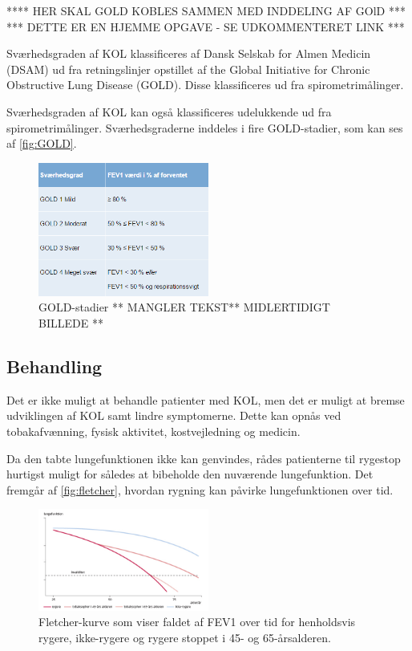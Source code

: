 \noindent
**** HER SKAL GOLD KOBLES SAMMEN MED INDDELING AF GOlD ***
*** DETTE ER EN HJEMME OPGAVE - SE UDKOMMENTERET LINK ***

Sværhedsgraden af KOL klassificeres af Dansk Selskab for Almen Medicin (DSAM) ud fra retningslinjer opstillet af the Global Initiative for Chronic Obstructive Lung Disease (GOLD). Disse klassificeres ud fra spirometrimålinger. 

Sværhedsgraden af KOL kan også klassificeres udelukkende ud fra spirometrimålinger. Sværhedsgraderne inddeles i fire GOLD-stadier, som kan ses af \autoref{fig:GOLD}.

\begin{figure} [H]
\centering
\includegraphics[width=0.5\textwidth]{figures/GOLD}
\caption{GOLD-stadier ** MANGLER TEKST** MIDLERTIDIGT BILLEDE ** \cite{Basisbogen2016, Sundhed2013}}
\label{fig:GOLD}
\end{figure} 


\subsection{Behandling}
Det er ikke muligt at behandle patienter med KOL, men det er muligt at bremse udviklingen af KOL samt lindre symptomerne. Dette kan opnås ved tobakafvænning, fysisk aktivitet, kostvejledning og medicin. 

Da den tabte lungefunktionen ikke kan genvindes, rådes patienterne til rygestop hurtigst muligt for således at bibeholde den nuværende lungefunktion. Det fremgår af \autoref{fig:fletcher}, hvordan rygning kan påvirke lungefunktionen over tid. 

\begin{figure} [H]
\centering
\includegraphics[width=0.5\textwidth]{figures/fletcher}
\caption{Fletcher-kurve som viser faldet af FEV1 over tid for henholdsvis rygere, ikke-rygere og rygere stoppet i 45- og 65-årsalderen.\cite{dsam2016}}
\label{fig:fletcher}
\end{figure} 

